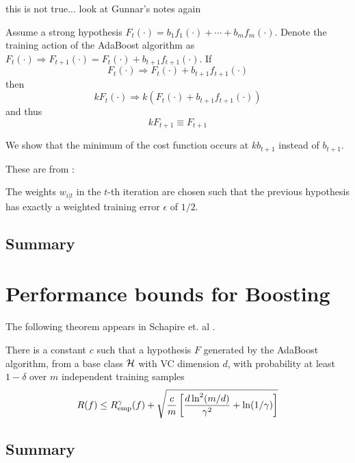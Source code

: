 this is not true... look at Gunnar's notes again

\begin{theorem}
Assume a strong hypothesis $F_t(\cdot) = b_1 f_1(\cdot) + \cdots + b_m
f_m(\cdot)$.  Denote the training action of the AdaBoost algorithm as
$F_t(\cdot) \Rightarrow F_{t+1}(\cdot) = F_t(\cdot) +
b_{t+1}f_{t+1}(\cdot)$.  If
\[
	F_t(\cdot) \Rightarrow F_t(\cdot) + b_{t+1}f_{t+1}(\cdot)
\]
then
\[
	kF_t(\cdot) \Rightarrow k\left( F_t(\cdot) +
	b_{t+1}f_{t+1}(\cdot) \right)
\]
and thus
\[
	kF_{t+1} \equiv F_{t+1}
\]

\proof We show that the minimum of the cost function occurs at
$kb_{t+1}$ instead of $b_{t+1}$.
\end{theorem}



These are from \cite{Ratsch98}:

\begin{theorem}
The weights $w_{i|t}$ in the $t$-th iteration are chosen such that the
previous hypothesis has exactly a weighted training error $\epsilon$
of $1/2$.
\end{theorem}

\subsection{Summary}


\section{Performance bounds for Boosting}

The following theorem appears in Schapire et. al \cite{Schapire97}.

\begin{theorem}[Performance bound for boosting ($p$=1)]

There is a constant $c$ such that a hypothesis $F$ generated by the
AdaBoost algorithm, from a base class $\mathcal{H}$ with VC dimension $d$,
with probability at least $1 - \delta$ over $m$ independent training
samples
\begin{equation}
R(f) \leq R_{\mathrm{emp}}^{\gamma}(f) + \sqrt{\frac{c}{m} \left[ \frac{d
\ln^2 (m/d)}{\gamma^2} + \ln(1/\gamma) \right] }
\end{equation}
\end{theorem}


\subsection{Summary}

